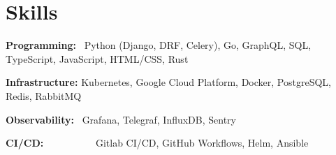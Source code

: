 \documentclass{article}
\begin{document}

\section{Skills}

\textbf{Programming:}~ Python (Django, DRF, Celery), Go, GraphQL, SQL, TypeScript, JavaScript, HTML/CSS, Rust
\vspace{0.5em}

\textbf{Infrastructure:} Kubernetes, Google Cloud Platform, Docker, PostgreSQL, Redis, RabbitMQ
\vspace{0.5em}

\textbf{Observability:}~ Grafana, Telegraf, InfluxDB, Sentry
\vspace{0.5em}

\textbf{CI/CD:}~~~~~~~~~~ Gitlab CI/CD, GitHub Workflows, Helm, Ansible
\end{document}

